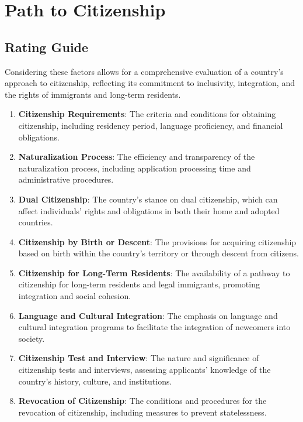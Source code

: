 \section{Path to Citizenship}

\subsection{Rating Guide}
Considering these factors allows for a comprehensive
evaluation of a country's approach to citizenship,
reflecting its commitment to inclusivity, integration,
and the rights of immigrants and long-term residents.
\begin{enumerate}
  \item \textbf{Citizenship Requirements}: The criteria
  and conditions for obtaining citizenship, including
  residency period, language proficiency, and financial
  obligations.
  
  \item \textbf{Naturalization Process}: The efficiency
  and transparency of the naturalization process, including
  application processing time and administrative procedures.
  
  \item \textbf{Dual Citizenship}: The country's stance on
  dual citizenship, which can affect individuals' rights and
  obligations in both their home and adopted countries.
  
  \item \textbf{Citizenship by Birth or Descent}: The provisions
  for acquiring citizenship based on birth within the country's
  territory or through descent from citizens.
  
  \item \textbf{Citizenship for Long-Term Residents}: The
  availability of a pathway to citizenship for long-term
  residents and legal immigrants, promoting integration
  and social cohesion.
  
  \item \textbf{Language and Cultural Integration}: The
  emphasis on language and cultural integration programs
  to facilitate the integration of newcomers into society.
  
  \item \textbf{Citizenship Test and Interview}: The nature
  and significance of citizenship tests and interviews,
  assessing applicants' knowledge of the country's history,
  culture, and institutions.
  
  \item \textbf{Revocation of Citizenship}: The conditions and
  procedures for the revocation of citizenship, including measures
  to prevent statelessness.
  

\end{enumerate}
